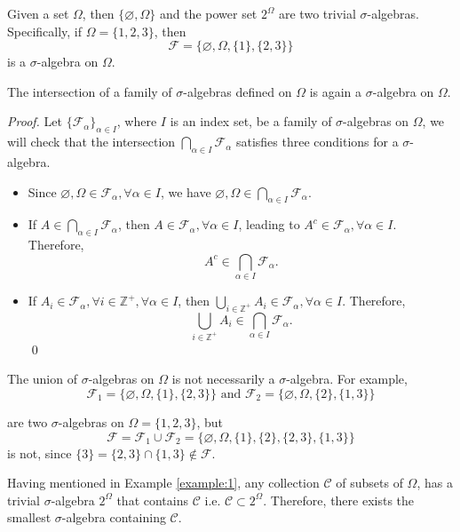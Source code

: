 \begin{example}
  \label{example:1}
  Given a set $\Omega$, then $\{\varnothing, \Omega\}$ and the power set $2^\Omega$ are two trivial $\sigma$-algebras. Specifically, if $\Omega=\{1,2,3\}$, then
  $$\mathcal{F}=\{\varnothing,\Omega, \{1\}, \{2,3\}\}$$
  is a $\sigma$-algebra on $\Omega$.
\end{example}

\begin{theorem}
  The intersection of a family of $\sigma$-algebras defined on $\Omega$ is again a $\sigma$-algebra on $\Omega$.
\end{theorem}

\textit{Proof.} Let $\{\mathcal{F}_\alpha\}_{\alpha\in I}$, where $I$ is an index set, be a family of $\sigma$-algebras on $\Omega$, we will check that the intersection $\bigcap\limits_{\alpha\in I}\mathcal{F}_\alpha$ satisfies three conditions for a $\sigma$-algebra.
\begin{itemize}
  \item Since $\varnothing,\Omega\in\mathcal{F}_\alpha,\forall\alpha\in I$, we have $\varnothing,\Omega\in\bigcap\limits_{\alpha\in I}\mathcal{F}_\alpha$.
  \item If $A\in\bigcap\limits_{\alpha\in I}\mathcal{F}_\alpha$, then $A\in \mathcal{F}_\alpha,\forall\alpha\in I$, leading to $A^c\in \mathcal{F}_\alpha,\forall\alpha\in I$. Therefore,
        $$A^c\in\bigcap\limits_{\alpha\in I}\mathcal{F}_\alpha.$$
  \item If $A_i\in\mathcal{F}_\alpha,\forall i\in\mathbb{Z}^+,\forall \alpha\in I$, then $\bigcup\limits_{i\in\mathbb{Z}^+}A_i\in\mathcal{F}_\alpha,\forall\alpha\in I$. Therefore,
        $$\bigcup\limits_{i\in\mathbb{Z}^+}A_i\in\bigcap\limits_{\alpha\in I}\mathcal{F}_\alpha.$$ \qed
\end{itemize}

\begin{remark}
  The union of $\sigma$-algebras on $\Omega$ is not necessarily a $\sigma$-algebra. For example,
  $$\mathcal{F}_1=\{\varnothing,\Omega, \{1\}, \{2,3\}\} \text{ and } \mathcal{F}_2=\{\varnothing,\Omega, \{2\}, \{1,3\}\}$$

  are two $\sigma$-algebras on $\Omega=\{1,2,3\}$, but
  $$\mathcal{F}=\mathcal{F}_1\cup\mathcal{F}_2=\{\varnothing,\Omega,\{1\},\{2\},\{2,3\},\{1,3\}\}$$ is not, since $\{3\}=\{2,3\}\cap\{1,3\}\notin \mathcal{F}$.
\end{remark}

Having mentioned in Example \ref{example:1}, any collection $\mathcal{C}$ of subsets of $\Omega$, has a trivial $\sigma$-algebra $2^\Omega$ that contains $\mathcal{C}$ i.e. $\mathcal{C}\subset2^\Omega$. Therefore, there exists the smallest $\sigma$-algebra containing $\mathcal{C}$.

